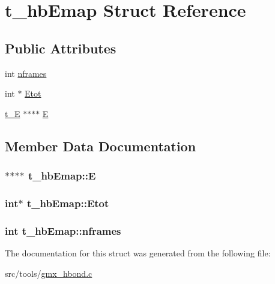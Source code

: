 \hypertarget{structt__hbEmap}{\section{t\-\_\-hb\-Emap \-Struct \-Reference}
\label{structt__hbEmap}
}
\subsection*{\-Public \-Attributes}
\begin{DoxyCompactItemize}
\item 
int \hyperlink{structt__hbEmap_a27ffa61b5576a8828e526420173ae555}{nframes}
\item 
int $\ast$ \hyperlink{structt__hbEmap_ae5918f9765d0498231f8eb496a670ec3}{\-Etot}
\item 
\hyperlink{gmx__hbond_8c_ac24b35201cd34ed20e95613e9b206651}{t\-\_\-\-E} $\ast$$\ast$$\ast$$\ast$ \hyperlink{structt__hbEmap_aca36a6a7077b414e1fde128bbee64fd2}{\-E}
\end{DoxyCompactItemize}


\subsection{\-Member \-Data \-Documentation}
\hypertarget{structt__hbEmap_aca36a6a7077b414e1fde128bbee64fd2}{
\subsubsection[{\-E}]{$\ast$$\ast$$\ast$$\ast$ {\bf t\-\_\-hb\-Emap\-::\-E}}}\label{structt__hbEmap_aca36a6a7077b414e1fde128bbee64fd2}
\hypertarget{structt__hbEmap_ae5918f9765d0498231f8eb496a670ec3}{
\subsubsection[{\-Etot}]{\setlength{\rightskip}{0pt plus 5cm}int$\ast$ {\bf t\-\_\-hb\-Emap\-::\-Etot}}}\label{structt__hbEmap_ae5918f9765d0498231f8eb496a670ec3}
\hypertarget{structt__hbEmap_a27ffa61b5576a8828e526420173ae555}{
\subsubsection[{nframes}]{\setlength{\rightskip}{0pt plus 5cm}int {\bf t\-\_\-hb\-Emap\-::nframes}}}\label{structt__hbEmap_a27ffa61b5576a8828e526420173ae555}


\-The documentation for this struct was generated from the following file\-:\begin{DoxyCompactItemize}
\item 
src/tools/\hyperlink{gmx__hbond_8c}{gmx\-\_\-hbond.\-c}\end{DoxyCompactItemize}
